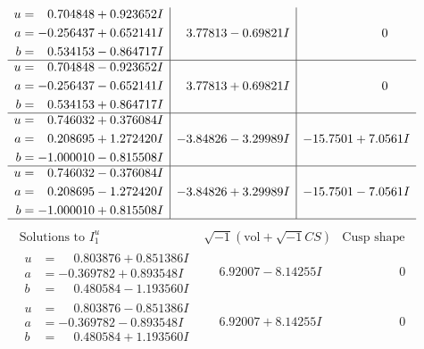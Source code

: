 \documentclass[1p]{elsarticle_modified}
\theoremstyle{definition}
\newcommand{\I}{\sqrt{-1}}
\begin{document}
$$\begin{array}{c|c|c}
\begin{aligned}
u &= \phantom{-}0.704848 + 0.923652 I \\
a &= -0.256437 + 0.652141 I \\
b &= \phantom{-}0.534153 - 0.864717 I\end{aligned}
 & \phantom{-}3.77813 - 0.69821 I & \phantom{-0.000000 } 0 \\ \hline\begin{aligned}
u &= \phantom{-}0.704848 - 0.923652 I \\
a &= -0.256437 - 0.652141 I \\
b &= \phantom{-}0.534153 + 0.864717 I\end{aligned}
 & \phantom{-}3.77813 + 0.69821 I & \phantom{-0.000000 } 0 \\ \hline\begin{aligned}
u &= \phantom{-}0.746032 + 0.376084 I \\
a &= \phantom{-}0.208695 + 1.272420 I \\
b &= -1.000010 - 0.815508 I\end{aligned}
 & -3.84826 - 3.29989 I & -15.7501 + 7.0561 I \\ \hline\begin{aligned}
u &= \phantom{-}0.746032 - 0.376084 I \\
a &= \phantom{-}0.208695 - 1.272420 I \\
b &= -1.000010 + 0.815508 I\end{aligned}
 & -3.84826 + 3.29989 I & -15.7501 - 7.0561 I\\
 \hline 
 \end{array}$$\newpage$$\begin{array}{c|c|c}  
\text{Solutions to }I^u_{1}& \I (\text{vol} + \sqrt{-1}CS) & \text{Cusp shape}\\
 \hline 
\begin{aligned}
u &= \phantom{-}0.803876 + 0.851386 I \\
a &= -0.369782 + 0.893548 I \\
b &= \phantom{-}0.480584 - 1.193560 I\end{aligned}
 & \phantom{-}6.92007 - 8.14255 I & \phantom{-0.000000 } 0 \\ \hline\begin{aligned}
u &= \phantom{-}0.803876 - 0.851386 I \\
a &= -0.369782 - 0.893548 I \\
b &= \phantom{-}0.480584 + 1.193560 I\end{aligned}
 & \phantom{-}6.92007 + 8.14255 I & \phantom{-0.000000 } 0 \\ \hline\begin{aligned}

\end{aligned}
\end{array}$$
\end{document}
